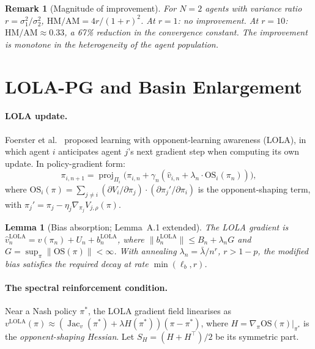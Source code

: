 \documentclass[10pt,letterpaper]{article}
\newtheorem{lemma}[theorem]{Lemma}
\newtheorem{remark}[theorem]{Remark}
\newcommand{\norm}[1]{\| #1 \|}
\newcommand{\HM}{\mathrm{HM}}
\newcommand{\AM}{\mathrm{AM}}
\newcommand{\proj}{\operatorname{proj}}
\DeclareMathOperator{\Jac}{Jac}
\begin{document}
\begin{remark}[Magnitude of improvement]
For $N = 2$ agents with variance ratio $r = \sigma_1^2/\sigma_2^2$,
$\HM/\AM = 4r/(1+r)^2$. At $r = 1$: no improvement. At $r = 10$:
$\HM/\AM \approx 0.33$, a 67\% reduction in the convergence constant.
The improvement is monotone in the heterogeneity of the agent population.
\end{remark}

\section{LOLA-PG and Basin Enlargement}
\label{sec:lola}

\paragraph{LOLA update.}
Foerster et al.~\cite{foerster2018} proposed learning with
opponent-learning awareness (LOLA), in which agent $i$ anticipates
agent $j$'s next gradient step when computing its own update.
In policy-gradient form:
\begin{equation}
  \label{eq:lola}
  \pi_{i,n+1} = \proj_{\Pi_i}\!\bigl(\pi_{i,n} + \gamma_n(\hat{v}_{i,n} + \lambda_n \cdot \mathrm{OS}_i(\pi_n))\bigr),
\end{equation}
where $\mathrm{OS}_i(\pi) = \sum_{j \neq i} (\partial V_i / \partial \pi_j) \cdot (\partial \pi_j' / \partial \pi_i)$
is the opponent-shaping term, with $\pi_j' = \pi_j - \eta_j \nabla_{\pi_j} V_{j,\rho}(\pi)$.

\begin{lemma}[Bias absorption; \cite{giannou2022} Lemma~A.1 extended]
\label{lem:bias}
The LOLA gradient is $\hat{v}_n^{\mathrm{LOLA}} = v(\pi_n) + U_n + b_n^{\mathrm{LOLA}}$,
where $\norm{b_n^{\mathrm{LOLA}}} \leq B_n + \lambda_n G$ and
$G = \sup_\pi \norm{\mathrm{OS}(\pi)} < \infty$. With annealing
$\lambda_n = \bar\lambda / n^r$, $r > 1 - p$, the modified bias
satisfies the required decay at rate $\min(\ell_b, r)$.
\end{lemma}

\paragraph{The spectral reinforcement condition.}
Near a Nash policy $\pi^*$, the LOLA gradient field linearises as
$v^{\mathrm{LOLA}}(\pi) \approx (\Jac_v(\pi^*) + \lambda H(\pi^*))(\pi - \pi^*)$,
where $H = \nabla_\pi \mathrm{OS}(\pi)|_{\pi^*}$ is the
\emph{opponent-shaping Hessian}. Let $S_H = (H + H^\top)/2$ be
its symmetric part.
\end{document}

